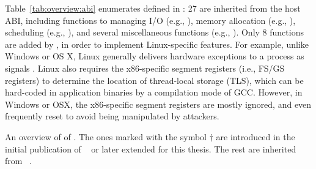 Table~\ref{tab:overview:abi} enumerates \palcallnum{} \hostapis{} defined in \thehostabi{}:
27 are inherited from the \drawbridge{} host ABI,
including functions to managing I/O (e.g., ), memory allocation (e.g., ), scheduling (e.g., ), and several miscellaneous functions (e.g., ).
Only 8 functions are added by \graphene{}, in order to implement Linux-specific features.
For example, unlike Windows or OS X, Linux generally
delivers hardware exceptions to a process as signals .
Linux also requires 
the x86-specific segment registers (i.e., FS/GS registers)
to determine the location of thread-local storage (TLS), which can be hard-coded in application binaries by a compilation mode of GCC.
However, in Windows or OSX, the x86-specific segment registers are mostly ignored, and even frequently reset to avoid being manipulated by attackers.




\begin{table}[htp!]
\centering

\caption{An overview of \thehostabi{} of \graphene{}. The ones marked with the symbol $\dagger$ are introduced in the initial publication of \graphene{}~\cite{tsai14graphene} or later extended for this thesis. The rest are inherited from \drawbridge{}~\cite{porter11drawbridge}.}
\label{tab:overview:abi}
\end{table}

